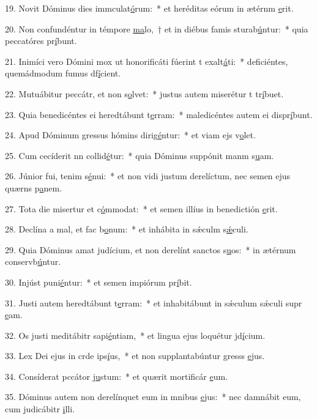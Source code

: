19. Novit Dóminus dies immculat\uline{ó}rum:~* et heréditas eórum in ætérnm \uline{e}rit.\par 
20. Non confundéntur in témpore \uline{ma}lo,~† et in diébus famis sturab\uline{ú}ntur:~* quia peccatóres pr\uline{í}bunt.\par 
21. Inimíci vero Dómini mox ut honorificáti fúerint t exalt\uline{á}ti:~* deficiéntes, quemádmodum fumus df\uline{í}cient.\par 
22. Mutuábitur peccátr, et non s\uline{o}lvet:~* justus autem miserétur t tr\uline{í}buet.\par 
23. Quia benedicéntes ei heredtábunt t\uline{e}rram:~* maledicéntes autem ei dispr\uline{í}bunt.\par 
24. Apud Dóminum gressus hómins dirig\uline{é}ntur:~* et viam ejs v\uline{o}let.\par 
25. Cum cecíderit nn collid\uline{é}tur:~* quia Dóminus suppónit manm s\uline{u}am.\par 
26. Júnior fui, tenim s\uline{é}nui:~* et non vidi justum derelíctum, nec semen ejus quærns p\uline{a}nem.\par 
27. Tota die misertur et c\uline{ó}mmodat:~* et semen illíus in benedictión \uline{e}rit.\par 
28. Declína a mal, et fac b\uline{o}num:~* et inhábita in sǽculm s\uline{ǽ}culi.\par 
29. Quia Dóminus amat judícium, et non derelínt sanctos s\uline{u}os:~* in ætérnum conservb\uline{ú}ntur.\par 
30. Injúst puni\uline{é}ntur:~* et semen impiórum pr\uline{í}bit.\par 
31. Justi autem heredtábunt t\uline{e}rram:~* et inhabitábunt in sǽculum sǽculi supr \uline{e}am.\par 
32. Os justi meditábitr sapi\uline{é}ntiam,~* et lingua ejus loquétur jd\uline{í}cium.\par 
33. Lex Dei ejus in crde ips\uline{í}us,~* et non supplantabúntur gresss \uline{e}jus.\par 
34. Consíderat pccátor j\uline{u}stum:~* et quærit mortificár \uline{e}um.\par 
35. Dóminus autem non derelínquet eum in mnibus \uline{e}jus:~* nec damnábit eum, cum judicábitr \uline{i}lli.\par 
